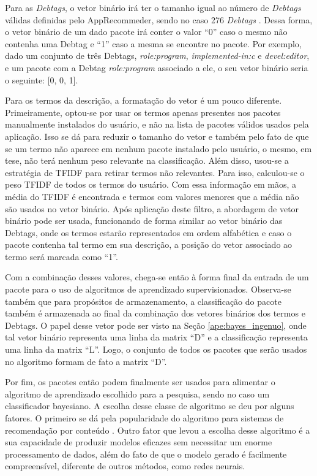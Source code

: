 Para as \textit{Debtags}, o vetor binário irá ter o tamanho igual ao número de
\textit{Debtags} válidas definidas pelo AppRecommeder, sendo no caso 276
\textit{Debtags} \cite{araujo2011apprecommender}. Dessa forma,
o vetor binário de um dado pacote irá conter o valor ``0'' caso o mesmo não
contenha uma Debtag e ``1'' caso a mesma se encontre
no pacote. Por exemplo, dado um conjunto de três Debtags, \textit{role:program},
\textit{implemented-in:c} e \textit{devel:editor}, e um pacote com a Debtag
\textit{role:program} associado a ele, o seu vetor binário seria o seguinte: [0, 0, 1].

Para os termos da descrição, a formatação do vetor é um pouco diferente. Primeiramente, optou-se por usar os termos apenas presentes
nos pacotes manualmente instalados do usuário, e não na lista de pacotes válidos
usados pela aplicação. Isso se dá para reduzir o tamanho do vetor e também
pelo fato de que se um termo não aparece em nenhum pacote instalado pelo
usuário, o mesmo, em tese, não terá nenhum peso relevante na
classificação. Além disso, usou-se a estratégia de TFIDF para retirar termos não
relevantes. Para isso, calculou-se o peso TFIDF de todos os termos do usuário.
Com essa informação em mãos, a média do TFIDF é encontrada e termos com valores menores que a
média não são usados no vetor binário. Após aplicação deste filtro, a abordagem de vetor binário pode ser usada, funcionando de forma
similar ao vetor binário das Debtags, onde os termos estarão representados em ordem alfabética e caso o pacote contenha tal termo em sua
descrição, a posição do vetor associado ao termo será marcada como ``1''.

Com a combinação desses valores, chega-se então à forma final da entrada de um pacote para o uso de algoritmos de aprendizado
supervisionados. Observa-se também que para propósitos de armazenamento, a classificação do pacote também é armazenada ao final da combinação
dos vetores binários dos termos e Debtags. O papel desse vetor pode ser visto na
Seção \ref{ape:bayes_ingenuo}, onde tal vetor binário representa uma linha da
matrix ``D'' e a classificação representa uma linha da matrix ``L''. Logo, o
conjunto de todos os pacotes que serão usados no algoritmo formam de fato a
matrix ``D''.

Por fim, os pacotes então podem finalmente ser usados para alimentar o algoritmo de aprendizado escolhido para a pesquisa, sendo no caso um
classificador bayesiano. A escolha desse classe de algoritmo se deu por alguns fatores. O primeiro se dá pela popularidade do algoritmo para
sistemas de recomendação por conteúdo \cite{amatriain2011data}. Outro fator que levou a escolha desse algoritmo é a sua capacidade de produzir
modelos eficazes sem necessitar um enorme processamento de dados, além do fato
de que o modelo gerado é facilmente compreensível, diferente de outros métodos,
como redes neurais\cite{segaran2007programming}.

